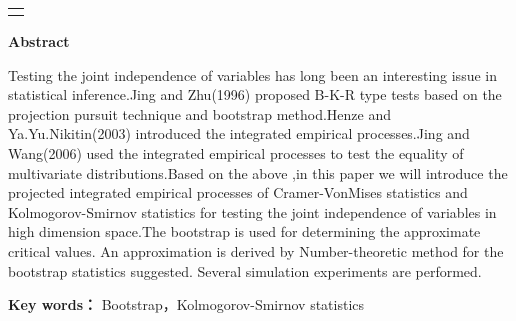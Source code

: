 \par
\vspace{1cm}
\noindent\begin{tabular}{l}
\hline\hline
\hspace*{14.5cm}
\end{tabular}

\begin{center}
{\bf \Large Abstract}\\
\vskip 0.6cm
\end{center}
\par
Testing the joint independence of variables has long been an
interesting issue in statistical inference.Jing and Zhu(1996)
proposed  B-K-R type tests based on the projection pursuit technique
and bootstrap method.Henze and Ya.Yu.Nikitin(2003) introduced the
integrated empirical processes.Jing and Wang(2006) used the
integrated empirical processes to test the equality of multivariate
distributions.Based on the above ,in this paper we will introduce
the projected integrated empirical processes of Cramer-VonMises
statistics and Kolmogorov-Smirnov statistics for testing the joint
independence of variables in high dimension space.The bootstrap is
used for determining the approximate critical values. An
approximation is derived by Number-theoretic method for the
bootstrap statistics suggested. Several simulation experiments are
performed.
\medskip
\par

{\bf Key words：} Bootstrap，Kolmogorov-Smirnov statistics

\newpage 
\mbox{} 

